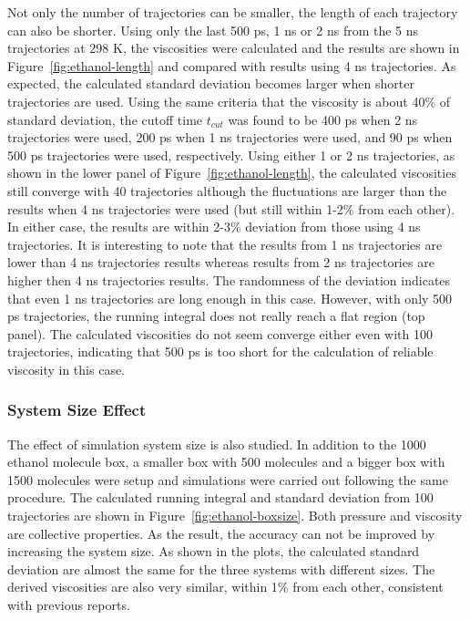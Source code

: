 \documentclass[12pt]{article}
\begin{document}
Not only the number of trajectories can be smaller,
the length of each trajectory can also be shorter.
Using only the last 500 ps, 1 ns or 2 ns from the 5 ns trajectories at 298 K,
the viscosities were calculated and the results are shown in Figure~\ref{fig:ethanol-length}
and compared with results using 4 ns trajectories.
As expected, the calculated standard deviation becomes larger when shorter trajectories are used.
Using the same criteria that the viscosity is about 40\% of standard deviation,
the cutoff time $t_{cut}$ was found to be 400 ps when 2 ns trajectories were used,
200 ps when 1 ns trajectories were used, 
and 90 ps when 500 ps trajectories were used, respectively.
Using either 1 or 2 ns trajectories,
as shown in the lower panel of Figure~\ref{fig:ethanol-length},
the calculated viscosities still converge with 40 trajectories
although the fluctuations are larger than the results when 4 ns trajectories were used
(but still within 1-2\% from each other).
In either case, the results are within 2-3\% deviation from those using 4 ns trajectories.
It is interesting to note that the results from 1 ns trajectories are lower than 4 ns trajectories results
whereas results from 2 ns trajectories are higher then 4 ns trajectories results.
The randomness of the deviation indicates that even 1 ns trajectories are long enough in this case.
However, with only 500 ps trajectories,
the running integral does not really reach a flat region (top panel).
The calculated viscosities do not seem converge either even with 100 trajectories,
indicating that 500 ps is too short for the calculation of reliable viscosity in this case.

\subsubsection{System Size Effect}

The effect of simulation system size is also studied.
In addition to the 1000 ethanol molecule box,
a smaller box with 500 molecules and a bigger box with 1500 molecules were setup
and simulations were carried out following the same procedure.
The calculated running integral and standard deviation from 100 trajectories are shown in Figure~\ref{fig:ethanol-boxsize}.
Both pressure and viscosity are collective properties.
As the result, the accuracy can not be improved by increasing the system size.
As shown in the plots,
the calculated standard deviation are almost the same for the three systems with different sizes.
The derived viscosities are also very similar, 
within 1\% from each other,
consistent with previous reports.
\cite{Alfe.PRL.81.5161.1998,
Hummer.JPCB.108.15873.2004,
Andreussi.JCP.137.044508.2012}
\end{document}
